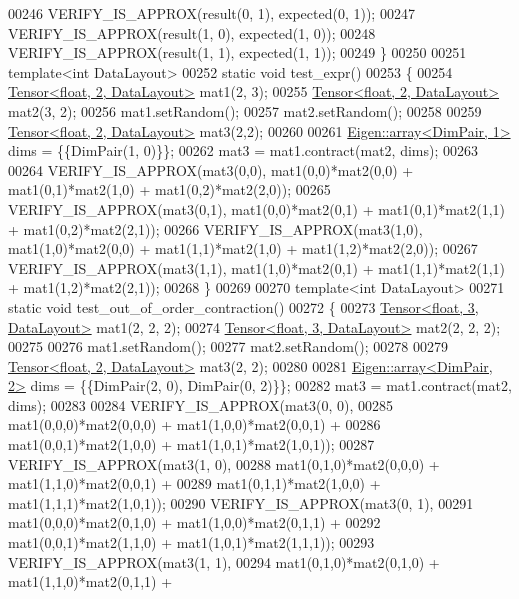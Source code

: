 \begin{DoxyCode}
00246   VERIFY\_IS\_APPROX(result(0, 1), expected(0, 1));
00247   VERIFY\_IS\_APPROX(result(1, 0), expected(1, 0));
00248   VERIFY\_IS\_APPROX(result(1, 1), expected(1, 1));
00249 \}
00250 
00251 \textcolor{keyword}{template}<\textcolor{keywordtype}{int} DataLayout>
00252 \textcolor{keyword}{static} \textcolor{keywordtype}{void} test\_expr()
00253 \{
00254   \hyperlink{class_eigen_1_1_tensor}{Tensor<float, 2, DataLayout>} mat1(2, 3);
00255   \hyperlink{class_eigen_1_1_tensor}{Tensor<float, 2, DataLayout>} mat2(3, 2);
00256   mat1.setRandom();
00257   mat2.setRandom();
00258 
00259   \hyperlink{class_eigen_1_1_tensor}{Tensor<float, 2, DataLayout>} mat3(2,2);
00260 
00261   \hyperlink{class_eigen_1_1array}{Eigen::array<DimPair, 1>} dims = \{\{DimPair(1, 0)\}\};
00262   mat3 = mat1.contract(mat2, dims);
00263 
00264   VERIFY\_IS\_APPROX(mat3(0,0), mat1(0,0)*mat2(0,0) + mat1(0,1)*mat2(1,0) + mat1(0,2)*mat2(2,0));
00265   VERIFY\_IS\_APPROX(mat3(0,1), mat1(0,0)*mat2(0,1) + mat1(0,1)*mat2(1,1) + mat1(0,2)*mat2(2,1));
00266   VERIFY\_IS\_APPROX(mat3(1,0), mat1(1,0)*mat2(0,0) + mat1(1,1)*mat2(1,0) + mat1(1,2)*mat2(2,0));
00267   VERIFY\_IS\_APPROX(mat3(1,1), mat1(1,0)*mat2(0,1) + mat1(1,1)*mat2(1,1) + mat1(1,2)*mat2(2,1));
00268 \}
00269 
00270 \textcolor{keyword}{template}<\textcolor{keywordtype}{int} DataLayout>
00271 \textcolor{keyword}{static} \textcolor{keywordtype}{void} test\_out\_of\_order\_contraction()
00272 \{
00273   \hyperlink{class_eigen_1_1_tensor}{Tensor<float, 3, DataLayout>} mat1(2, 2, 2);
00274   \hyperlink{class_eigen_1_1_tensor}{Tensor<float, 3, DataLayout>} mat2(2, 2, 2);
00275 
00276   mat1.setRandom();
00277   mat2.setRandom();
00278 
00279   \hyperlink{class_eigen_1_1_tensor}{Tensor<float, 2, DataLayout>} mat3(2, 2);
00280 
00281   \hyperlink{class_eigen_1_1array}{Eigen::array<DimPair, 2>} dims = \{\{DimPair(2, 0), DimPair(0, 2)\}\};
00282   mat3 = mat1.contract(mat2, dims);
00283 
00284   VERIFY\_IS\_APPROX(mat3(0, 0),
00285                    mat1(0,0,0)*mat2(0,0,0) + mat1(1,0,0)*mat2(0,0,1) +
00286                    mat1(0,0,1)*mat2(1,0,0) + mat1(1,0,1)*mat2(1,0,1));
00287   VERIFY\_IS\_APPROX(mat3(1, 0),
00288                    mat1(0,1,0)*mat2(0,0,0) + mat1(1,1,0)*mat2(0,0,1) +
00289                    mat1(0,1,1)*mat2(1,0,0) + mat1(1,1,1)*mat2(1,0,1));
00290   VERIFY\_IS\_APPROX(mat3(0, 1),
00291                    mat1(0,0,0)*mat2(0,1,0) + mat1(1,0,0)*mat2(0,1,1) +
00292                    mat1(0,0,1)*mat2(1,1,0) + mat1(1,0,1)*mat2(1,1,1));
00293   VERIFY\_IS\_APPROX(mat3(1, 1),
00294                    mat1(0,1,0)*mat2(0,1,0) + mat1(1,1,0)*mat2(0,1,1) +

\end{DoxyCode}
